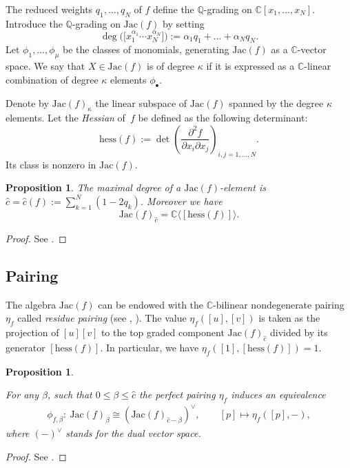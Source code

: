 \documentclass[10pt,a4paper]{article}
\numberwithin{equation}{section}
\newtheorem{Proposition}[Theorem]{Proposition}
 { \theoremstyle{definition}
\newtheorem{Definition}[Theorem]{Definition}
\newtheorem{Note}[Theorem]{Note}
\newtheorem{Example}[Theorem]{Example}
\newtheorem{Remark}[Theorem]{Remark} }
\newcommand{\CC}{{\mathbb{C}}}
\newcommand{\QQ}{{\mathbb{Q}}}
\newcommand{\Jac}{\mathrm{Jac}}
\newcommand{\hess}{\mathrm{hess}}
\begin{document}
The reduced weights $q_1,\dots,q_N$ of $f$ define the $\QQ$-grading on $\CC[x_1,\dots,x_N]$.
Introduce the $\QQ$-grading on $\Jac(f)$ by setting
\[
	\deg\bigl(\bigl[x_1^{\alpha_1}\cdots x_N^{\alpha_N}\bigr]\bigr) := \alpha_1q_1 + \dots + \alpha_Nq_N.
\]
Let $\phi_1,\dots,\phi_\mu$ be the classes of monomials, generating $\Jac(f)$ as a $\CC$-vector space.
We say that $X \in \Jac(f)$ is of degree $\kappa$ if it is expressed as a $\CC$-linear combination of degree $\kappa$ elements $\phi_\bullet$.

Denote by $\Jac(f)_\kappa$ the linear subspace of $\Jac(f)$ spanned by the degree $\kappa$ elements. Let the {\em Hessian} of~$f$ be defined as the following determinant:
\begin{equation*}
\hess(f):=\det \left(\frac{\partial^2 f}{\partial x_{i} \partial x_{j}}\right)_{i,j=1,\dots,N}.
\end{equation*}
Its class is nonzero in $\Jac(f)$.

\begin{Proposition}\label{prop: top degree}
	The maximal degree of a $\Jac(f)$-element is ${\widehat c}={\widehat c}(f) := \sum_{k=1}^N (1 - 2 q_k)$. Moreover we have
	\[
		\Jac(f)_{\widehat c} = \CC \langle [\hess(f)] \rangle.
	\]
\end{Proposition}
\begin{proof}
 See \cite[Section II]{AGV85}.
\end{proof}

\subsection{Pairing}
The algebra $\Jac(f)$ can be endowed with the $\CC$-bilinear nondegenerate pairing $\eta_f$ called \textit{residue pairing} (see \cite[Chapter~5]{GH94}, \cite[Section~5.11]{AGV85}).
The value $\eta_f([u],[v])$ is taken as the projection of $[u][v]$ to the top graded component $\Jac(f)_{\widehat c}$ divided by its generator $[\hess(f)]$. In particular, we have $\eta_f([1],[\hess(f)]) = 1$.

\begin{Proposition}\label{prop: grading of Jac(f)}

For any $\beta$, such that $0 \le \beta \le {\widehat c}$ the perfect pairing $\eta_f$ induces an equivalence
\begin{gather*}
\phi_{f,\beta}\colon\ \Jac(f)_{\beta} \cong (\Jac(f)_{{\widehat c} - \beta})^\vee,\qquad
[p]\mapsto \eta_f([p],-),
\end{gather*}
where $(-)^\vee$ stands for the dual vector space.
\end{Proposition}
\begin{proof}
 See \cite[Section II]{AGV85}.
\end{proof}
\end{document}
